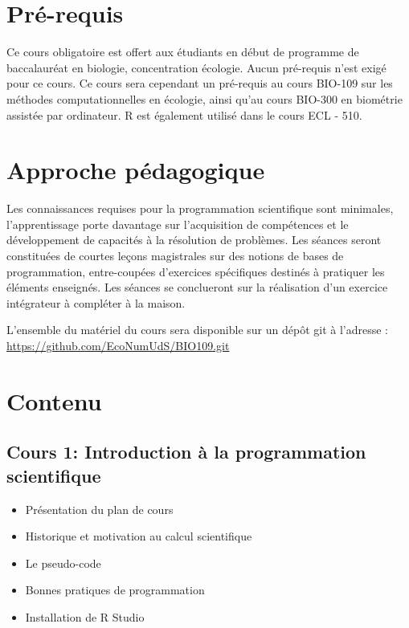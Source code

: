 \documentclass[12]{article}
\begin{document}
	\section*{Pré-requis}

	Ce cours obligatoire est offert aux étudiants en début de programme de
	baccalauréat en biologie, concentration écologie. Aucun pré-requis n'est
	exigé pour ce cours. Ce cours sera cependant un pré-requis au cours
	BIO-109 sur les méthodes computationnelles en écologie, ainsi qu'au cours
	BIO-300 en biométrie assistée par ordinateur. R est également utilisé
	dans le cours ECL - 510.

	\section*{Approche pédagogique}

	Les connaissances requises pour la programmation scientifique sont
	minimales, l'apprentissage porte davantage sur l'acquisition de
	compétences et le développement de capacités à la résolution de problèmes.
	Les séances seront constituées de courtes leçons magistrales sur des
	notions de bases de programmation, entre-coupées d'exercices spécifiques
	destinés à pratiquer les éléments enseignés. Les séances se conclueront
	sur la réalisation d'un exercice intégrateur à compléter à la maison.

	L'ensemble du matériel du cours sera disponible sur un dépôt git à l'adresse :\\
	\url{https://github.com/EcoNumUdS/BIO109.git}

	\section*{Contenu}

	\subsection*{Cours 1: Introduction à la programmation scientifique}
	\begin{itemize}
	\renewcommand{\labelitemi}{$\bullet$}
		\item Présentation du plan de cours
		\item Historique et motivation au calcul scientifique
		\item Le pseudo-code
		\item Bonnes pratiques de programmation
		\item Installation de R Studio
	\end{itemize}
\end{document}
